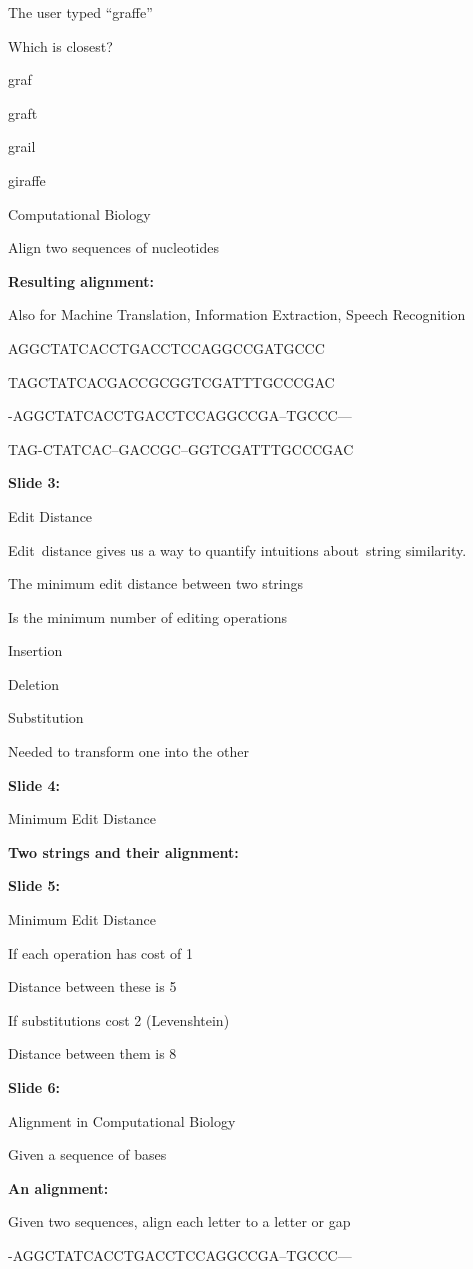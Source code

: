 \documentclass[11pt,a4paper]{article}
\begin{document}
The user typed “graffe”

Which is closest?

graf

graft

grail

giraffe

Computational Biology

Align two sequences of nucleotides

\textbf{Resulting alignment:} 

Also for Machine Translation, Information Extraction, Speech Recognition

AGGCTATCACCTGACCTCCAGGCCGATGCCC

TAGCTATCACGACCGCGGTCGATTTGCCCGAC

-AGGCTATCACCTGACCTCCAGGCCGA--TGCCC---

TAG-CTATCAC--GACCGC--GGTCGATTTGCCCGAC

\textbf{Slide 3:}

Edit Distance

Edit distance gives us a way to quantify intuitions about string similarity.

The minimum edit distance between two strings

Is the minimum number of editing operations

Insertion

Deletion

Substitution

Needed to transform one into the other

\textbf{Slide 4:}

Minimum Edit Distance

\textbf{Two strings and their alignment:} 

\textbf{Slide 5:}

Minimum Edit Distance

If each operation has cost of 1

Distance between these is 5

If substitutions cost 2 (Levenshtein)

Distance between them is 8

\textbf{Slide 6:}

Alignment in Computational Biology

Given a sequence of bases

\textbf{An alignment:} 

Given two sequences, align each letter to a letter or gap

-AGGCTATCACCTGACCTCCAGGCCGA--TGCCC---
\end{document}

